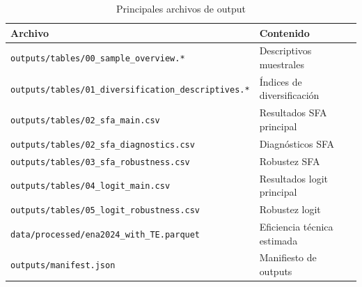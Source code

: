 \documentclass[11pt,a4paper]{article}
\begin{document}
\begin{table}[H]
\centering
\caption{Principales archivos de output}
\label{tab:output_files}
\begin{threeparttable}
\small
\begin{tabular}{ll}
\toprule
\textbf{Archivo} & \textbf{Contenido} \\
\midrule
\texttt{outputs/tables/00\_sample\_overview.*} & Descriptivos muestrales \\
\texttt{outputs/tables/01\_diversification\_descriptives.*} & Índices de diversificación \\
\texttt{outputs/tables/02\_sfa\_main.csv} & Resultados SFA principal \\
\texttt{outputs/tables/02\_sfa\_diagnostics.csv} & Diagnósticos SFA \\
\texttt{outputs/tables/03\_sfa\_robustness.csv} & Robustez SFA \\
\texttt{outputs/tables/04\_logit\_main.csv} & Resultados logit principal \\
\texttt{outputs/tables/05\_logit\_robustness.csv} & Robustez logit \\
\texttt{data/processed/ena2024\_with\_TE.parquet} & Eficiencia técnica estimada \\
\texttt{outputs/manifest.json} & Manifiesto de outputs \\
\bottomrule
\end{tabular}
\end{threeparttable}
\end{table}
\end{document}
